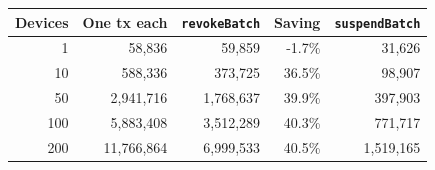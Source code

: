 \begin{tabular}{@{}rrrrr@{}}
\toprule
Devices & One tx each & \texttt{revokeBatch} & Saving & \texttt{suspendBatch} \\
\midrule
1 & 58{,}836 & 59{,}859 & -1.7\% & 31{,}626 \\
10 & 588{,}336 & 373{,}725 & 36.5\% & 98{,}907 \\
50 & 2{,}941{,}716 & 1{,}768{,}637 & 39.9\% & 397{,}903 \\
100 & 5{,}883{,}408 & 3{,}512{,}289 & 40.3\% & 771{,}717 \\
200 & 11{,}766{,}864 & 6{,}999{,}533 & 40.5\% & 1{,}519{,}165 \\
\bottomrule
\end{tabular}